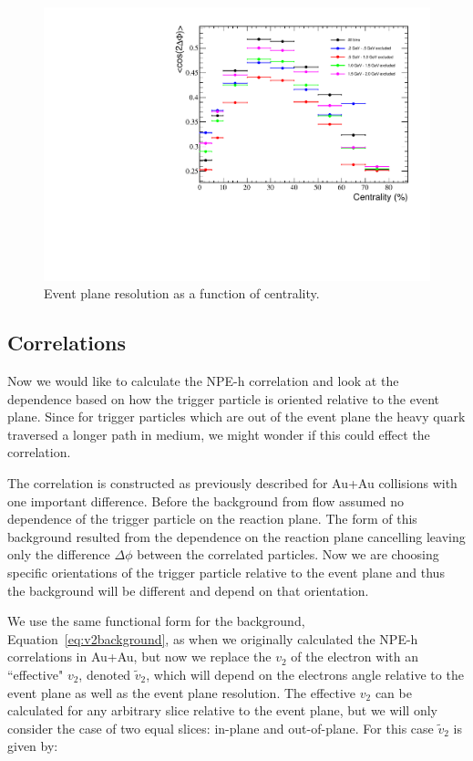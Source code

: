 \begin{figure}[htbp]
\begin{center}
\includegraphics[scale=.75]{Plots/Correlations/EPRes_MRP.pdf}
\end{center}
\caption[Event Plane Resolutions]{Event plane resolution as a function of centrality.}
\label{fig:EPRes_MRP}
\end{figure}

\subsection{Correlations}

Now we would like to calculate the NPE-h correlation and look at the dependence based on how the trigger particle is oriented relative to the event plane. Since for trigger particles which are out of the event plane the heavy quark traversed a longer path in medium, we might wonder if this could effect the correlation.

The correlation is constructed as previously described for Au+Au collisions with one important difference. Before the background from flow assumed no dependence of the trigger particle on the reaction plane. The form of this background resulted from the dependence on the reaction plane cancelling leaving only the difference $\Delta\phi$ between the correlated particles. Now we are choosing specific orientations of the trigger particle relative to the event plane and thus the background will be different and depend on that orientation.

We use the same functional form for the background, Equation~\ref{eq:v2background}, as when we originally calculated the NPE-h correlations in Au+Au, but now we replace the $v_2$ of the electron with an ``effective" $v_2$, denoted $\widetilde{v}_{2}$, which will depend on the electrons angle relative to the event plane as well as the event plane resolution. The effective $v_2$ can be calculated for any arbitrary slice relative to the event plane, but we will only consider the case of two equal slices: in-plane and out-of-plane. For this case $\widetilde{v}_{2}$ is given by:

